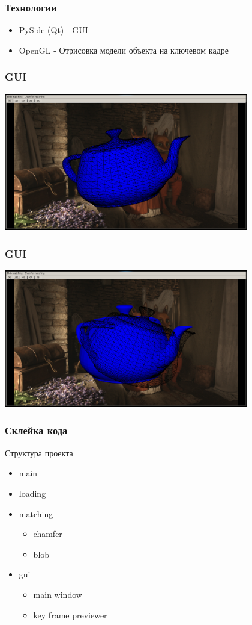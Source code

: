 \begin{frame}\frametitle{Технологии}
    \begin{itemize}
        \item PySide (Qt) - GUI
        \item OpenGL      - Отрисовка модели объекта на ключевом кадре
    \end{itemize}
\end{frame}

\begin{frame}\frametitle{GUI}
    \includegraphics[height=6cm]{gui_samples/sample_01.png}
\end{frame}

\begin{frame}\frametitle{GUI}
    \includegraphics[height=6cm]{gui_samples/sample_02.png}
\end{frame}

\begin{frame}\frametitle{Склейка кода}
    Структура проекта
    \begin{itemize}
        \item main
        \item loading
        \item matching
            \begin{itemize}
                \item chamfer
                \item blob
            \end{itemize}
        \item gui
            \begin{itemize}
                \item main window
                \item key frame previewer
            \end{itemize}
    \end{itemize}
\end{frame}


